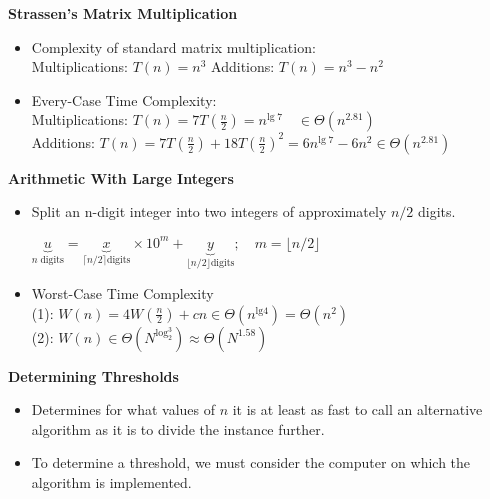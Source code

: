 \documentclass{../cheat}
\begin{document}
\begin{multicols}{3}
		
		
	\textbf{Strassen's Matrix Multiplication}
	\begin{itemize}
		\item Complexity of standard matrix multiplication:\\
		Multiplications: $T(n)=n^3$ \hfill Additions: $T(n)=n^3-n^2$
		\item Every-Case Time Complexity: \\
			Multiplications: $T(n) = 7T(\frac{n}{2}) = n^{\text{lg}\;7} \quad \in \Theta(n^{2.81})$\\
			Additions: $T(n) = 7T(\frac{n}{2}) + 18T(\frac{n}{2})^2 = 6n^{\text{lg}\;7}-6n^2 \in \Theta(n^{2.81})$
	\end{itemize}
	
	\textbf{Arithmetic With Large Integers}
	\begin{itemize}
		\item Split an n-digit integer into two integers of approximately $n/2$ digits.\\
			\centerline{$\underbrace{u}_{n \; \text{digits}} =
				\underbrace{x}_{\lceil n/2 \rceil \text{digits}} \times 10^m + \underbrace{y}_{\lfloor n/2 \rfloor \text{digits}} 
				;\quad m=\lfloor n/2 \rfloor $}
		\item Worst-Case Time Complexity\\
			(1): $W(n)=4W(\frac{n}{2})+cn \in \Theta(n^{\text{lg}4})=\Theta(n^2)$\\
			(2): $W(n) \in \Theta(N^{\log_2^3}) \approx \Theta(N^{1.58})$
	\end{itemize}
	

	\textbf{Determining Thresholds}
	\begin{itemize}
		\item Determines for what values of $n$ it is at least as fast to call an alternative algorithm as it is to divide the instance further.
		\item To determine a threshold, we must consider the computer on which the algorithm is implemented. 
	\end{itemize}
	

\end{multicols}
\end{document}

